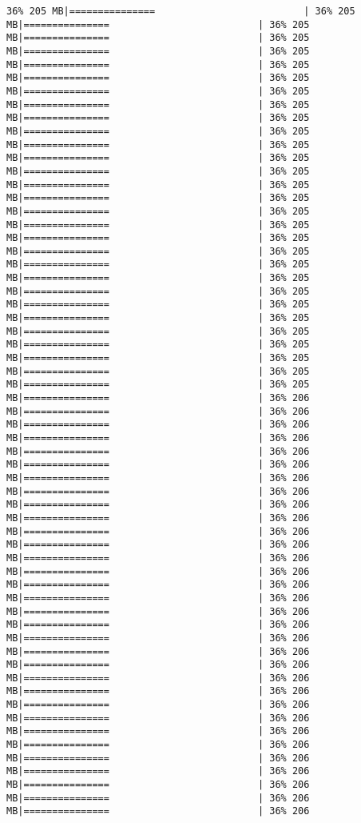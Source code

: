 \documentclass[
]{article}
\begin{document}
\begin{verbatim}
36% 205 MB|===============                          | 36% 205 MB|===============                          | 36% 205 MB|===============                          | 36% 205 MB|===============                          | 36% 205 MB|===============                          | 36% 205 MB|===============                          | 36% 205 MB|===============                          | 36% 205 MB|===============                          | 36% 205 MB|===============                          | 36% 205 MB|===============                          | 36% 205 MB|===============                          | 36% 205 MB|===============                          | 36% 205 MB|===============                          | 36% 205 MB|===============                          | 36% 205 MB|===============                          | 36% 205 MB|===============                          | 36% 205 MB|===============                          | 36% 205 MB|===============                          | 36% 205 MB|===============                          | 36% 205 MB|===============                          | 36% 205 MB|===============                          | 36% 205 MB|===============                          | 36% 205 MB|===============                          | 36% 205 MB|===============                          | 36% 205 MB|===============                          | 36% 205 MB|===============                          | 36% 205 MB|===============                          | 36% 205 MB|===============                          | 36% 205 MB|===============                          | 36% 205 MB|===============                          | 36% 206 MB|===============                          | 36% 206 MB|===============                          | 36% 206 MB|===============                          | 36% 206 MB|===============                          | 36% 206 MB|===============                          | 36% 206 MB|===============                          | 36% 206 MB|===============                          | 36% 206 MB|===============                          | 36% 206 MB|===============                          | 36% 206 MB|===============                          | 36% 206 MB|===============                          | 36% 206 MB|===============                          | 36% 206 MB|===============                          | 36% 206 MB|===============                          | 36% 206 MB|===============                          | 36% 206 MB|===============                          | 36% 206 MB|===============                          | 36% 206 MB|===============                          | 36% 206 MB|===============                          | 36% 206 MB|===============                          | 36% 206 MB|===============                          | 36% 206 MB|===============                          | 36% 206 MB|===============                          | 36% 206 MB|===============                          | 36% 206 MB|===============                          | 36% 206 MB|===============                          | 36% 206 MB|===============                          | 36% 206 MB|===============                          | 36% 206 MB|===============                          | 36% 206 MB|===============                          | 36% 206 MB|===============                          | 36% 206 
\end{verbatim}
\end{document}
